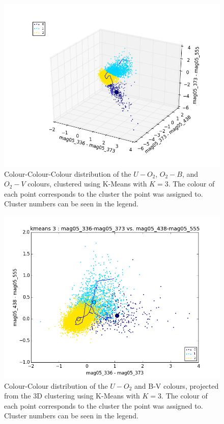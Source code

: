 \begin{figure}
\centering
\includegraphics[width=\linewidth]{figs/successful/kmeans_3d_3cl_mag05_336-mag05_373vsmag05_373-mag05_438vsmag05_373-mag05_555}
\caption{Colour-Colour-Colour distribution of the $U-O_{2}$, $O_{2}-B$, and $O_{2}-V$ colours, clustered using K-Means with $K=3$. The colour of each point corresponds to the cluster the point was assigned to. Cluster numbers can be seen in the legend.}
\label{fig:UOIIKM3d}
\end{figure}

\begin{figure}
\centering
\includegraphics[width=\linewidth]{figs/successful/kmeans_base_color_3cl_mag05_336-mag05_373vsmag05_438-mag05_555}
\caption{Colour-Colour distribution of the $U-O_{2}$ and B-V colours, projected from the 3D clustering using K-Means with $K=3$. The colour of each point corresponds to the cluster the point was assigned to. Cluster numbers can be seen in the legend.}
\label{fig:UOIIKM2d}
\end{figure}

